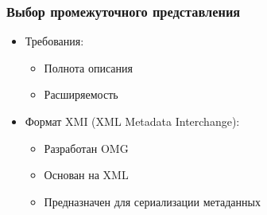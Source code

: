 \documentclass{beamer}
\begin{document}
\begin{frame}
\frametitle{Выбор промежуточного представления}

\begin{itemize}
    \item Требования:
    \begin{itemize}
        \item Полнота описания
        \item Расширяемость
    \end{itemize}
    \item Формат XMI (XML Metadata Interchange):
    \begin{itemize}
        \item Разработан OMG
        \item Основан на XML
        \item Предназначен для сериализации метаданных
    \end{itemize}
\end{itemize}

\end{frame}
\end{document}
